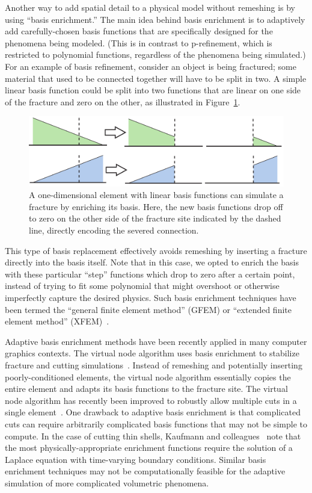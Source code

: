 Another way to add spatial detail to a physical model without remeshing is by using ``basis enrichment.'' The main idea behind basis enrichment is to adaptively add carefully-chosen basis functions that are specifically designed for the phenomena being modeled. (This is in contrast to p-refinement, which is restricted to polynomial functions, regardless of the phenomena being simulated.) For an example of basis refinement, consider an object is being fractured; some material that used to be connected together will have to be split in two. A simple linear basis function could be split into two functions that are linear on one side of the fracture and zero on the other, as illustrated in Figure~\ref{fig:basisenrichment}. 
\begin{figure}[t]
	\centering
	\includegraphics[width=0.8\linewidth]{images/starAdaptivity-cgf2016/xfem.png}
	\caption[STAR adaptivity: XFEM illustration]{\label{fig:basisenrichment}
		A one-dimensional element with linear basis functions can simulate a fracture by enriching its basis. Here, the new basis functions drop off to zero on the other side of the fracture site indicated by the dashed line, directly encoding the severed connection.
	}
\end{figure}

This type of basis replacement effectively avoids remeshing by inserting a fracture directly into the basis itself. Note that in this case, we opted to enrich the basis with these particular ``step'' functions which drop to zero after a certain point, instead of trying to fit some polynomial that might overshoot or otherwise imperfectly capture the desired physics. Such basis enrichment techniques have been termed the ``general finite element method'' (GFEM) or ``extended finite element method'' (XFEM)~\cite{belytschko2009review}.

Adaptive basis enrichment methods have been recently applied in many computer graphics contexts.
The virtual node algorithm uses basis enrichment to stabilize fracture and cutting simulations~\cite{Molino2004,hegemann2013level}. Instead of remeshing and potentially inserting poorly-conditioned elements, the virtual node algorithm essentially copies the entire element and adapts its basis functions to the fracture site. The virtual node algorithm  has recently been improved to robustly allow multiple cuts in a single element~\cite{Sifakis2007:Cutting,Wang2014}. One drawback to adaptive basis enrichment is that complicated cuts can require arbitrarily complicated basis functions that may not be simple to compute. In the case of cutting thin shells, Kaufmann and colleagues~\cite{Kaufmann2009} note that the most physically-appropriate enrichment functions require the solution of a Laplace equation with time-varying boundary conditions. Similar basis enrichment techniques may not be computationally feasible for the adaptive simulation of more complicated volumetric phenomena.


